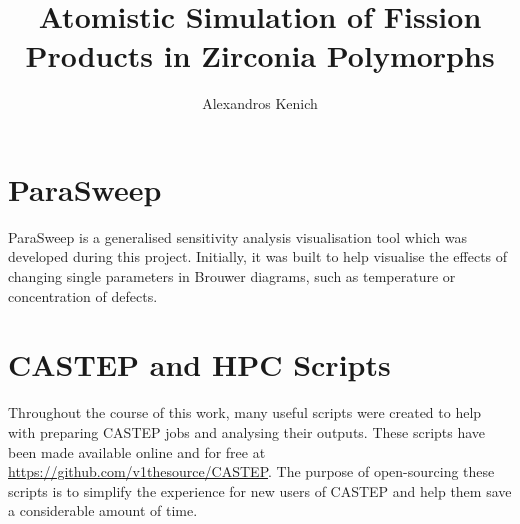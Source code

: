 \documentclass[a4paper,12pt,twoside]{report}
\begin{document}

\title{\LARGE {\bf Atomistic Simulation of Fission Products in Zirconia Polymorphs}
}

\author{Alexandros Kenich}

\normallinespacing
\maketitle



\preface
%
%

\body

\doublespacing


\label{References}
\renewcommand\bibname{References}



\appendix
\label{Appendix}

\chapter{ParaSweep}

ParaSweep is a generalised sensitivity analysis visualisation tool which was developed during this project. Initially, it was built to help visualise the effects of changing single parameters in Brouwer diagrams, such as temperature or concentration of defects. 


\chapter{CASTEP and HPC Scripts}

Throughout the course of this work, many useful scripts were created to help with preparing CASTEP jobs and analysing their outputs. These scripts have been made available online and for free at \href{https://github.com/v1thesource/CASTEP}{https://github.com/v1thesource/CASTEP}. The purpose of open-sourcing these scripts is to simplify the experience for new users of CASTEP and help them save a considerable amount of time.
\end{document}
